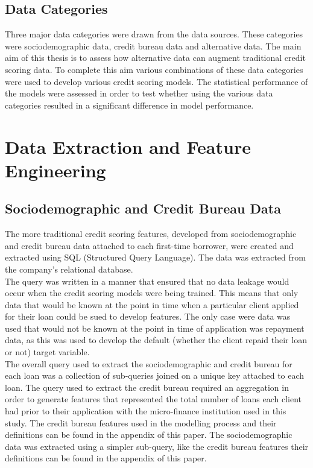 \subsection{Data Categories}

Three major data categories were drawn from the data sources. These categories were sociodemographic data, credit bureau data and alternative data. The main aim of this thesis is to assess how alternative data can augment traditional credit scoring data. To complete this aim various combinations of these data categories were used to develop various credit scoring models. The statistical performance of the models were assessed in order to test whether using the various data categories resulted in a significant difference in model performance. 


\section{Data Extraction and Feature Engineering}

\subsection{Sociodemographic and Credit Bureau Data}

The more traditional credit scoring features, developed from sociodemographic and credit bureau data attached to each first-time borrower, were created and extracted using SQL (Structured Query Language). The data was extracted from the company's relational database. \\

The query was written in a manner that ensured that no data leakage would occur when the credit scoring models were being trained. This means that only data that would be known at the point in time when a particular client applied for their loan could be sued to develop features. The only case were data was used that would not be known at the point in time of application was repayment data, as this was used to develop the default (whether the client repaid their loan or not) target variable. \\

The overall query used to extract the sociodemographic and credit bureau for each loan was a collection of sub-queries joined on a unique key attached to each loan. The query used to extract the credit bureau required an aggregation in order to generate features that represented the total number of loans each client had prior to their application with the micro-finance institution used in this study. The credit bureau features used in the modelling process and their definitions can be found in the appendix of this paper. The sociodemographic data was extracted using a simpler sub-query,  like the credit bureau features their definitions can be found in the appendix of this paper.  \\


